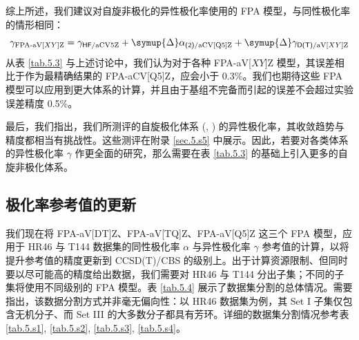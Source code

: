 综上所述，我们建议对自旋非极化的异性极化率使用的 FPA 模型，与同性极化率的情形相同：
\begin{equation}
    \label{eq.fpa-gamma}
    \gamma_{\text{FPA-aV[}XY\text{]Z}} = \gamma_{\textsf{HF}/\text{aCV5Z}} + \symup{\Delta} \alpha_{\textsf{(2)}/\text{aCV[Q5]Z}} + \symup{\Delta} \gamma_{\textsf{D(T)}/\text{aV[}XY\text{]Z}}
\end{equation}
从表 \ref{tab.5.3} 与上述讨论中，我们认为对于各种 FPA-aV[$XY$]Z 模型，其误差相比于作为最精确结果的 FPA-aCV[Q5]Z，应会小于 0.3\%。我们也期待这些 FPA 模型可以应用到更大体系的计算，并且由于基组不完备而引起的误差不会超过实验误差精度 0.5\%。

最后，我们指出，我们所测评的自旋极化体系 (, ) 的异性极化率，其收敛趋势与精度都相当有挑战性。这些测评在附录 \ref{sec.5.s5} 中展示。因此，若要对各类体系的异性极化率 $\gamma$ 作更全面的研究，那么需要在表 \ref{tab.5.3} 的基础上引入更多的自旋非极化体系。

\subsection{极化率参考值的更新}

我们现在将 FPA-aV[DT]Z、FPA-aV[TQ]Z、FPA-aV[Q5]Z 这三个 FPA 模型，应用于 HR46 与 T144 数据集的同性极化率 $\alpha$ 与异性极化率 $\gamma$ 参考值的计算，以将提升参考值的精度更新到 CCSD(T)/CBS 的级别上。出于计算资源限制、但同时要以尽可能高的精度给出数据，我们需要对 HR46 与 T144 分出子集；不同的子集将使用不同级别的 FPA 模型。表 \ref{tab.5.4} 展示了数据集分割的总体情况。需要指出，该数据分割方式并非毫无偏向性：以 HR46 数据集为例，其 Set I 子集仅包含无机分子、而 Set III 的大多数分子都具有芳环。详细的数据集分割情况参考表 \ref{tab.5.s1}, \ref{tab.5.s2}, \ref{tab.5.s3}, \ref{tab.5.s4}。

\begin{table}[!ht]
\centering
\caption{数据集依 CCSD(T) 计算能力限制的分割总体情况、以及分割后子集在计算极化率时对应使用的 FPA 模型。}
\label{tab.5.4}
\end{table}

